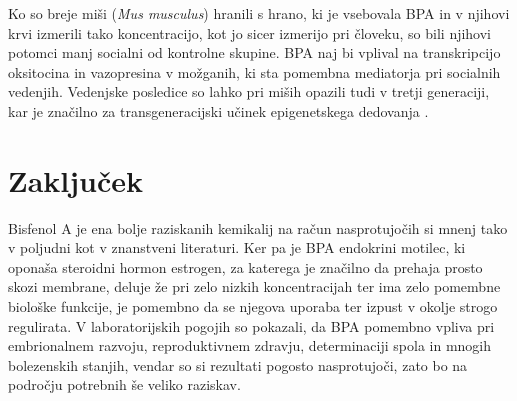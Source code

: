 \documentclass[a4paper, 11pt]{article}
\begin{document}
Ko so breje miši ({\it Mus musculus}) hranili s hrano, ki je vsebovala BPA in v njihovi krvi izmerili tako koncentracijo, kot jo sicer izmerijo pri človeku, so bili njihovi potomci manj socialni od kontrolne skupine. BPA naj bi vplival na transkripcijo oksitocina in vazopresina v možganih, ki sta pomembna mediatorja pri socialnih vedenjih. Vedenjske posledice so lahko pri miših opazili tudi v tretji generaciji, kar je značilno za transgeneracijski učinek epigenetskega dedovanja \parencites{wolstenholme2011role}. 

\section*{Zaključek}
Bisfenol A je ena bolje raziskanih {\color{red}kemikalij} na račun nasprotujočih si mnenj tako v poljudni kot v znanstveni literaturi. Ker pa je BPA endokrini motilec, ki oponaša steroidni hormon estrogen, za katerega je značilno da prehaja prosto skozi membrane, deluje že pri zelo nizkih koncentracijah ter ima zelo {\color{red}pomembne} biološke funkcije, je pomembno da se njegova uporaba ter izpust v okolje strogo regulirata. V laboratorijskih pogojih so pokazali, da BPA pomembno vpliva pri embrionalnem razvoju, reproduktivnem zdravju, determinaciji spola in mnogih bolezenskih stanjih, vendar so si rezultati pogosto nasprotujoči, zato bo na področju potrebnih še veliko raziskav.

\printbibliography
\end{document}
